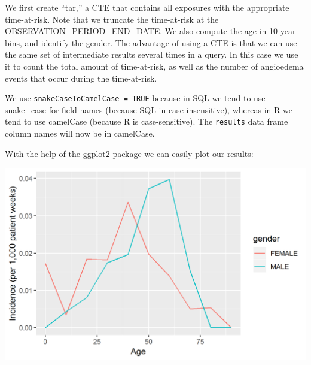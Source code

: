 \documentclass[11pt]{book}
\newenvironment{Shaded}{\begin{snugshade}}{\end{snugshade}}
\newcommand{\CommentTok}[1]{\textcolor[rgb]{0.56,0.35,0.01}{\textit{#1}}}
\newcommand{\DataTypeTok}[1]{\textcolor[rgb]{0.13,0.29,0.53}{#1}}
\newcommand{\DecValTok}[1]{\textcolor[rgb]{0.00,0.00,0.81}{#1}}
\newcommand{\KeywordTok}[1]{\textcolor[rgb]{0.13,0.29,0.53}{\textbf{#1}}}
\newcommand{\NormalTok}[1]{#1}
\newcommand{\OperatorTok}[1]{\textcolor[rgb]{0.81,0.36,0.00}{\textbf{#1}}}
\newcommand{\StringTok}[1]{\textcolor[rgb]{0.31,0.60,0.02}{#1}}
\theoremstyle{definition}
\theoremstyle{definition}
\theoremstyle{definition}
\theoremstyle{remark}
\begin{document}
We first create ``tar,'' a CTE that contains all exposures with the appropriate time-at-risk. Note that we truncate the time-at-risk at the OBSERVATION\_PERIOD\_END\_DATE. We also compute the age in 10-year bins, and identify the gender. The advantage of using a CTE is that we can use the same set of intermediate results several times in a query. In this case we use it to count the total amount of time-at-risk, as well as the number of angioedema events that occur during the time-at-risk.

We use \texttt{snakeCaseToCamelCase\ =\ TRUE} because in SQL we tend to use snake\_case for field names (because SQL in case-insensitive), whereas in R we tend to use camelCase (because R is case-sensitive). The \texttt{results} data frame column names will now be in camelCase.

With the help of the ggplot2 package we can easily plot our results:

\begin{Shaded}
\end{Shaded}

\begin{center}\includegraphics[width=0.8\linewidth]{images/SqlAndR/ir} \end{center}
\end{document}
